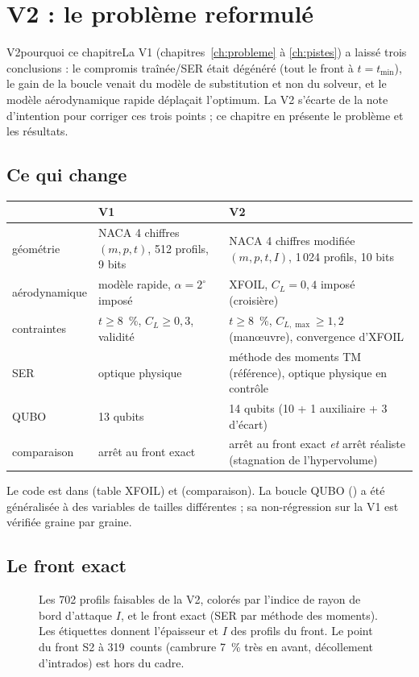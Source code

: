 \chapter{V2 : le problème reformulé}\label{ch:v2}

\begin{evolution}{V2}{pourquoi ce chapitre}La V1 (chapitres~\ref{ch:probleme} à \ref{ch:pistes}) a laissé trois conclusions : le compromis traînée/SER était dégénéré (tout le front à $t=t_{\min}$), le gain de la boucle venait du modèle de substitution et non du solveur, et le modèle aérodynamique rapide déplaçait l'optimum. La V2 s'écarte de la note d'intention pour corriger ces trois points ; ce chapitre en présente le problème et les résultats.\end{evolution}

\section{Ce qui change}
\begin{center}
\renewcommand{\arraystretch}{1.2}
\begin{tabularx}{\linewidth}{lXX}
\toprule
 & V1 & V2 \\
\midrule
géométrie & NACA 4 chiffres $(m,p,t)$, 512 profils, 9 bits & NACA 4 chiffres modifiée $(m,p,t,I)$, 1\,024 profils, 10 bits \\
aérodynamique & modèle rapide, $\alpha=2^\circ$ imposé & XFOIL, $C_L=0{,}4$ imposé (croisière) \\
contraintes & $t\ge8$~\%, $C_L\ge0{,}3$, validité & $t\ge8$~\%, $C_{L,\max}\ge1{,}2$ (manœuvre), convergence d'XFOIL \\
SER & optique physique & méthode des moments TM (référence), optique physique en contrôle \\
QUBO & 13 qubits & 14 qubits (10 + 1 auxiliaire + 3 d'écart) \\
comparaison & arrêt au front exact & arrêt au front exact \emph{et} arrêt réaliste (stagnation de l'hypervolume) \\
\bottomrule
\end{tabularx}
\end{center}
Le code est dans  (table XFOIL) et  (comparaison). La boucle QUBO () a été généralisée à des variables de tailles différentes ; sa non-régression sur la V1 est vérifiée graine par graine.

\section{Le front exact}
\begin{figure}[htbp]
\centering

\caption{Les 702 profils faisables de la V2, colorés par l'indice de rayon de bord d'attaque $I$, et le front exact (SER par méthode des moments). Les étiquettes donnent l'épaisseur et $I$ des profils du front. Le point du front S2 à 319~counts (cambrure 7~\% très en avant, décollement d'intrados) est hors du cadre.}\label{fig:v2-fronts}
\end{figure}

